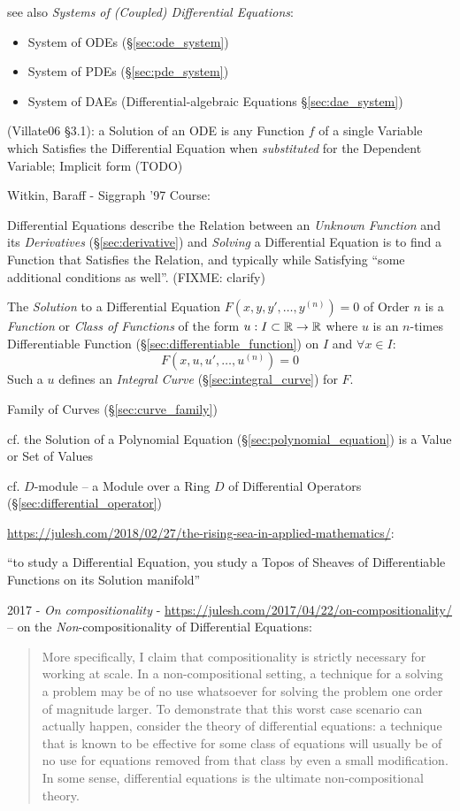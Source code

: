 see also \emph{Systems of (Coupled) Differential Equations}:
\begin{itemize}
  \item System of ODEs (\S\ref{sec:ode_system})
  \item System of PDEs (\S\ref{sec:pde_system})
  \item System of DAEs (Differential-algebraic Equations \S\ref{sec:dae_system})
\end{itemize}

(Villate06 \S 3.1): a Solution of an ODE is any Function $f$ of a single
Variable which Satisfies the Differential Equation when \emph{substituted} for
the Dependent Variable; Implicit form (TODO)

Witkin, Baraff - Siggraph '97 Course:

Differential Equations describe the Relation between an \emph{Unknown Function}
and its \emph{Derivatives} (\S\ref{sec:derivative}) and \emph{Solving} a
Differential Equation is to find a Function that Satisfies the Relation, and
typically while Satisfying ``some additional conditions as well''. (FIXME:
clarify)

\asterism

The \emph{Solution} to a Differential Equation $F(x,y,y',\ldots,y^{(n)}) = 0$
of Order $n$ is a \emph{Function} or \emph{Class of Functions} of the form $u :
I \subset \mathbb{R} \rightarrow \mathbb{R}$ where $u$ is an $n$-times Differentiable
Function (\S\ref{sec:differentiable_function}) on $I$ and $\forall x \in I$:
\[
  F(x,u,u',\ldots,u^{(n)}) = 0
\]
Such a $u$ defines an \emph{Integral Curve} (\S\ref{sec:integral_curve}) for
$F$.

\fist Family of Curves (\S\ref{sec:curve_family})

\fist cf. the Solution of a Polynomial Equation
(\S\ref{sec:polynomial_equation}) is a Value or Set of Values

\fist cf. $D$-module -- a Module over a Ring $D$ of Differential Operators
(\S\ref{sec:differential_operator})

\url{https://julesh.com/2018/02/27/the-rising-sea-in-applied-mathematics/}:

``to study a Differential Equation, you study a Topos of Sheaves of
Differentiable Functions on its Solution manifold''

2017 - \emph{On compositionality} -
\url{https://julesh.com/2017/04/22/on-compositionality/} --
on the \emph{Non}-compositionality of Differential Equations:
\begin{quote}
  More specifically, I claim that compositionality is strictly necessary
  for working at scale. In a non-compositional setting, a technique for a
  solving a problem may be of no use whatsoever for solving the problem one
  order of magnitude larger. To demonstrate that this worst case scenario can
  actually happen, consider the theory of differential equations: a technique
  that is known to be effective for some class of equations will usually be of
  no use for equations removed from that class by even a small modification. In
  some sense, differential equations is the ultimate non-compositional theory.
\end{quote}

